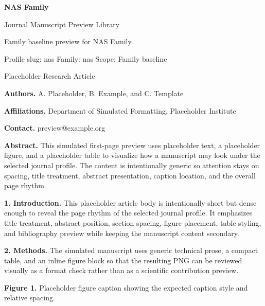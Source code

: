 \documentclass[10pt,a4paper]{article}
\begin{document}
\begin{center}
{\LARGE\bfseries NAS Family}\par
\vspace{0.25em}
{\small Journal Manuscript Preview Library}\par
\vspace{0.15em}
{\footnotesize Family baseline preview for NAS Family}\par
\vspace{0.2em}
{\footnotesize Profile slug: nas \quad Family: nas \quad Scope: Family baseline}
\end{center}
\vspace{0.2em}
 Placeholder Research Article\par\vspace{0.4em}


\noindent\textbf{Authors.} A. Placeholder, B. Example, and C. Template\par
\noindent\textbf{Affiliations.} Department of Simulated Formatting, Placeholder Institute\par
\noindent\textbf{Contact.} preview@example.org\par
\vspace{0.4em}
\noindent\textbf{Abstract.} This simulated first-page preview uses placeholder text, a placeholder figure, and a placeholder table to visualize how a manuscript may look under the selected journal profile. The content is intentionally generic so attention stays on spacing, title treatment, abstract presentation, caption location, and the overall page rhythm.\par\vspace{0.6em}



\small
\textbf{1. Introduction.} This placeholder article body is intentionally short but dense enough to reveal the page rhythm of the selected journal profile. It emphasizes title treatment, abstract position, section spacing, figure placement, table styling, and bibliography preview while keeping the manuscript content secondary.

\textbf{2. Methods.} The simulated manuscript uses generic technical prose, a compact table, and an inline figure block so that the resulting PNG can be reviewed visually as a format check rather than as a scientific contribution preview.


\begin{center}\end{center}\noindent\textbf{Figure 1.} Placeholder figure caption showing the expected caption style and relative spacing.\par\vspace{0.5em}
\end{document}
